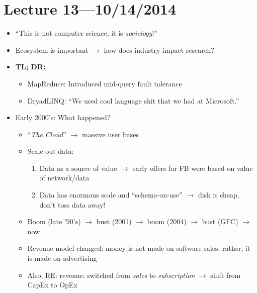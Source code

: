 \documentclass[10pt]{article}
\begin{document}
\section{Lecture 13---10/14/2014}

\begin{itemize}
\item ``This is not computer science, it is \emph{sociology}!''
\item Ecosystem is important $\rightarrow$ how does industry impact research?
\item \textbf{TL; DR:}
\begin{itemize}
\item MapReduce: Introduced mid-query fault tolerance
\item DryadLINQ: ``We used cool language shit that we had at Microsoft.''
\end{itemize}
\item Early 2000's: What happened?
\begin{itemize}
\item ``\emph{The Cloud}'' $\rightarrow$ massive user bases
\item Scale-out data:
\begin{enumerate}
\item Data as a source of value $\rightarrow$ early offers for FB were based on value of network/data
\item Data has enormous scale and ``schema-on-use'' $\rightarrow$ disk is cheap, don't toss data away!
\end{enumerate}
\item Boom (late '90's) $\rightarrow$ bust (2001) $\rightarrow$ boom (2004) $\rightarrow$ bust (GFC)
$\rightarrow$ now
\item Revenue model changed: money is not made on software sales, rather, it is made on advertising
\item Also, RE: revenue: switched from \emph{sales} to \emph{subscription} $\rightarrow$ shift from
CapEx to OpEx
\end{itemize}
\end{itemize}
\end{document}
